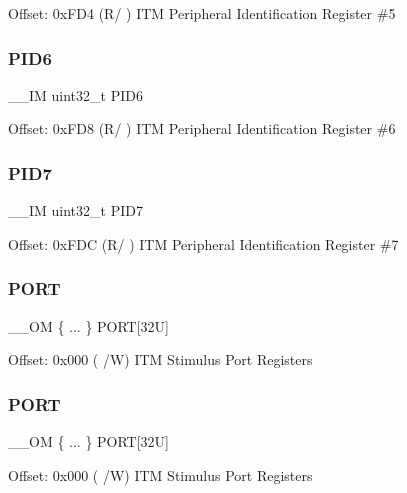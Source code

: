 Offset\+: 0x\+F\+D4 (R/ ) I\+TM Peripheral Identification Register \#5 \mbox{\label{struct_i_t_m___type_a83ac5d00dee24cc7f805b5c147625593}} 
\subsubsection{\texorpdfstring{PID6}{PID6}}
{\footnotesize\ttfamily \+\_\+\+\_\+\+IM uint32\+\_\+t P\+I\+D6}

Offset\+: 0x\+F\+D8 (R/ ) I\+TM Peripheral Identification Register \#6 \mbox{\label{struct_i_t_m___type_af8aa73aeaf37bdf7dfd9f6c437ff2d2f}} 
\subsubsection{\texorpdfstring{PID7}{PID7}}
{\footnotesize\ttfamily \+\_\+\+\_\+\+IM uint32\+\_\+t P\+I\+D7}

Offset\+: 0x\+F\+DC (R/ ) I\+TM Peripheral Identification Register \#7 \mbox{\label{struct_i_t_m___type_a41f63a3ff33f1644c1f5e2fc1d48181c}} 
\subsubsection{\texorpdfstring{PORT}{PORT}\hspace{0.1cm}{\footnotesize\ttfamily [1/2]}}
{\footnotesize\ttfamily \+\_\+\+\_\+\+OM \{ ... \}    P\+O\+RT\mbox{[}32\+U\mbox{]}}

Offset\+: 0x000 ( /W) I\+TM Stimulus Port Registers \mbox{\label{struct_i_t_m___type_a7203b1351025cde3c54dd83fdc6b7aab}} 
\subsubsection{\texorpdfstring{PORT}{PORT}\hspace{0.1cm}{\footnotesize\ttfamily [2/2]}}
{\footnotesize\ttfamily \+\_\+\+\_\+\+OM \{ ... \}    P\+O\+RT\mbox{[}32\+U\mbox{]}}

Offset\+: 0x000 ( /W) I\+TM Stimulus Port Registers \mbox{\label{struct_i_t_m___type_a4111c001c1e56fd3f51d27c5a63b04e6}} 
